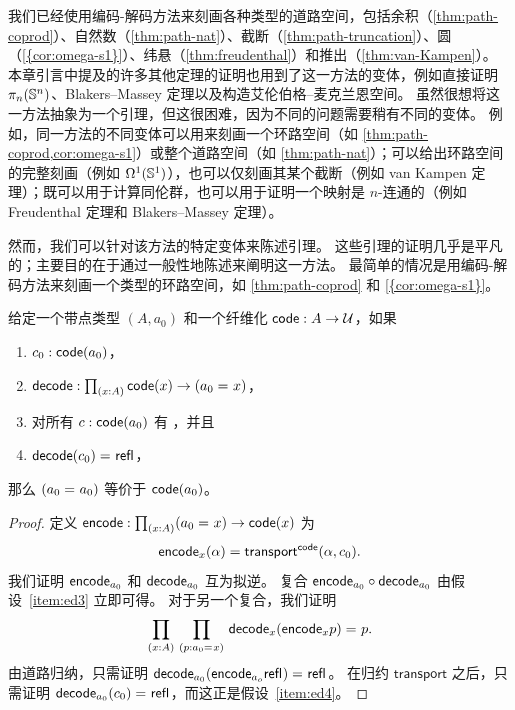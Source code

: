 
我们已经使用编码-解码方法来刻画各种类型的道路空间，包括余积（\cref{thm:path-coprod}）、自然数（\cref{thm:path-nat}）、截断（\cref{thm:path-truncation}）、圆（\cref{{cor:omega-s1}}）、纬悬（\cref{thm:freudenthal}）和推出（\cref{thm:van-Kampen}）。
本章引言中提及的许多其他定理的证明也用到了这一方法的变体，例如直接证明 $\pi_n(\mathbb{S}^n)$、Blakers--Massey 定理以及构造艾伦伯格–麦克兰恩空间。
虽然很想将这一方法抽象为一个引理，但这很困难，因为不同的问题需要稍有不同的变体。
例如，同一方法的不同变体可以用来刻画一个环路空间（如 \cref{thm:path-coprod,cor:omega-s1}）或整个道路空间（如 \cref{thm:path-nat}）；可以给出环路空间的完整刻画（例如 $\Omega^1(\mathbb{S} ^1)$），也可以仅刻画其某个截断（例如 van Kampen 定理）；既可以用于计算同伦群，也可以用于证明一个映射是 $n$-连通的（例如 Freudenthal 定理和 Blakers--Massey 定理）。

然而，我们可以针对该方法的特定变体来陈述引理。
这些引理的证明几乎是平凡的；主要目的在于通过一般性地陈述来阐明这一方法。
最简单的情况是用编码-解码方法来刻画一个类型的环路空间，如 \cref{thm:path-coprod} 和 \cref{{cor:omega-s1}}。

\begin{lem}[环路空间的编码-解码]\label{lem:encode-decode-loop}
给定一个带点类型 $(A,a_0)$ 和一个纤维化 $\mathsf{code} : A \to \mathcal{U}$，如果
\begin{enumerate}
\item $c_0 : \mathsf{code}(a_0)$，\label{item:ed1}
\item $\decode : \prd{x:A} \code(x) \to (\id{a_0}{x})$，\label{item:ed2}
\item 对所有 $c : \mathsf{code}(a_0)$ 有 ，并且\label{item:ed3}
\item $\mathsf{decode}(c_0) =_{} \mathsf{refl}_{}$，\label{item:ed4}
\end{enumerate}
那么 $(a_0 =_{} a_0)$ 等价于 $\mathsf{code}(a_0)$。
\end{lem}

\begin{proof}
定义
$\encode : \prd{x:A} (\id{a_0}{x}) \to \code(x)$ 为
\[
\mathsf{encode}_x(\alpha) = \mathsf{transport}^{\mathsf{code}}(\alpha,c_0).
\]
我们证明 $\mathsf{encode}_{a_0}$ 和 $\mathsf{decode}_{a_0}$ 互为拟逆。
复合 $\mathsf{encode}_{a_0} \circ \mathsf{decode}_{a_0}$ 由假设~\ref{item:ed3} 立即可得。
对于另一个复合，我们证明
\[
\prd{x:A}{p : \id{a_0}{x}} \id{\decode_{x} (\encode_{x} p)}{p}.
\]
由道路归纳，只需证明
${\mathsf{decode}_{{a_0}} (\mathsf{encode}_{{a_o}} \mathsf{refl}_{})} =_{} \mathsf{refl}_{}$。
在归约 $\mathsf{transport}$ 之后，只需证明
${\mathsf{decode}_{{a_0}} (c_0)} =_{} \mathsf{refl}_{}$，而这正是假设~\ref{item:ed4}。
\end{proof}

